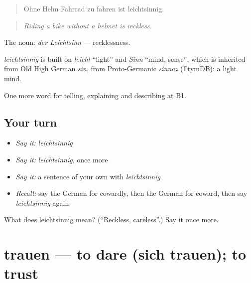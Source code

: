 \begin{quote}
Ohne Helm Fahrrad zu fahren ist leichtsinnig.
\end{quote}

\begin{quote}
\emph{Riding a bike without a helmet is reckless.}
\end{quote}

The noun: \emph{der Leichtsinn} — recklessness.

\begin{cousinweb}
\emph{leichtsinnig} is built on \emph{leicht} \textquotedblleft{}light\textquotedblright{} and \emph{Sinn} \textquotedblleft{}mind, sense\textquotedblright{}, which is inherited from Old High German \emph{sin}, from Proto-Germanic \emph{sinnaz} (EtymDB): a light mind.
\end{cousinweb}

\begin{grammarlens}[title={What you've built}]
One more word for telling, explaining and describing at B1.
\end{grammarlens}

\subsection*{Your turn}
\begin{itemize}
\raggedright
  \item \emph{Say it:} \emph{leichtsinnig}
  \item \emph{Say it:} \emph{leichtsinnig}, once more
  \item \emph{Say it:} a sentence of your own with \emph{leichtsinnig}
  \item \emph{Recall:} say the German for cowardly, then the German for coward, then say \emph{leichtsinnig} again
\end{itemize}

\begin{tcolorbox}[breakable,colback=teal!4,colframe=teal!35!black,title={Before you move on}]
What does leichtsinnig mean? (\textquotedblleft{}Reckless, careless\textquotedblright{}.) Say it once more.
\end{tcolorbox}
\section[trauen]{trauen — to dare (sich trauen); to trust}

\label{lesson:GE-C477-trauen}



